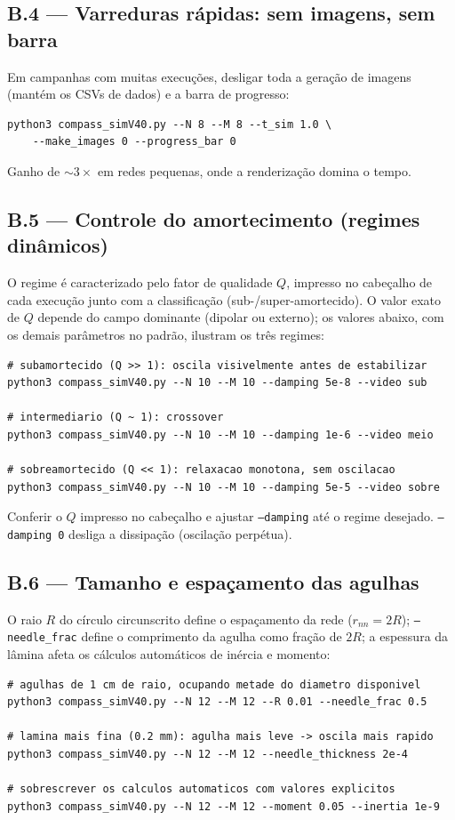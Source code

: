 \documentclass[11pt,a4paper]{article}
\newcommand{\code}[1]{\texttt{#1}}
\begin{document}
\subsection*{B.4 --- Varreduras rápidas: sem imagens, sem barra}

Em campanhas com muitas execuções, desligar toda a geração de imagens
(mantém os CSVs de dados) e a barra de progresso:
\begin{verbatim}
python3 compass_simV40.py --N 8 --M 8 --t_sim 1.0 \
    --make_images 0 --progress_bar 0
\end{verbatim}
Ganho de $\sim 3\times$ em redes pequenas, onde a renderização domina o
tempo.

\subsection*{B.5 --- Controle do amortecimento (regimes dinâmicos)}

O regime é caracterizado pelo fator de qualidade $Q$, impresso no
cabeçalho de cada execução junto com a classificação
(sub-/super-amortecido). O valor exato de $Q$ depende do campo
dominante (dipolar ou externo); os valores abaixo, com os demais
parâmetros no padrão, ilustram os três regimes:
\begin{verbatim}
# subamortecido (Q >> 1): oscila visivelmente antes de estabilizar
python3 compass_simV40.py --N 10 --M 10 --damping 5e-8 --video sub

# intermediario (Q ~ 1): crossover
python3 compass_simV40.py --N 10 --M 10 --damping 1e-6 --video meio

# sobreamortecido (Q << 1): relaxacao monotona, sem oscilacao
python3 compass_simV40.py --N 10 --M 10 --damping 5e-5 --video sobre
\end{verbatim}
Conferir o $Q$ impresso no cabeçalho e ajustar \code{--damping} até o
regime desejado. \code{--damping 0} desliga a dissipação (oscilação
perpétua).

\subsection*{B.6 --- Tamanho e espaçamento das agulhas}

O raio $R$ do círculo circunscrito define o espaçamento da rede
($r_{nn} = 2R$); \code{--needle\_frac} define o comprimento da agulha
como fração de $2R$; a espessura da lâmina afeta os cálculos
automáticos de inércia e momento:
\begin{verbatim}
# agulhas de 1 cm de raio, ocupando metade do diametro disponivel
python3 compass_simV40.py --N 12 --M 12 --R 0.01 --needle_frac 0.5

# lamina mais fina (0.2 mm): agulha mais leve -> oscila mais rapido
python3 compass_simV40.py --N 12 --M 12 --needle_thickness 2e-4

# sobrescrever os calculos automaticos com valores explicitos
python3 compass_simV40.py --N 12 --M 12 --moment 0.05 --inertia 1e-9
\end{verbatim}
\end{document}
